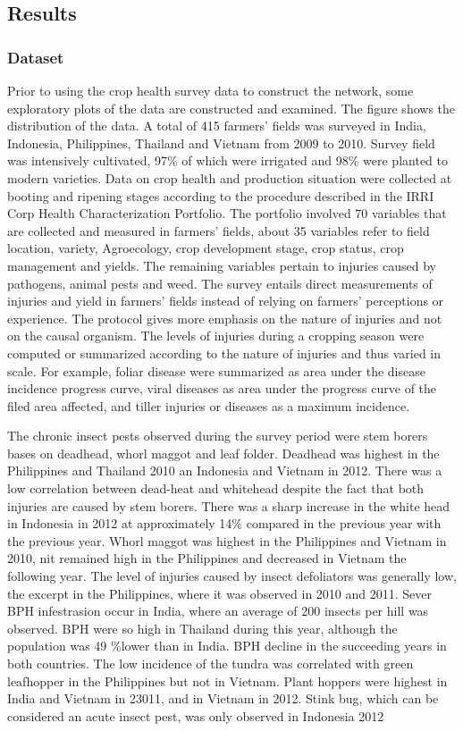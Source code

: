 \subsection{Results}

\subsubsection{Dataset}

Prior to using the crop health survey data to construct the network, some exploratory plots of the data are constructed and examined. The figure shows the distribution of the data. A total of 415 farmers' fields was surveyed in India, Indonesia, Philippines, Thailand and Vietnam from 2009 to 2010. Survey field was intensively cultivated, 97\% of which were irrigated and 98\% were planted to modern varieties. Data on crop health and production situation were collected at booting and ripening stages according to the procedure described in the IRRI Corp Health Characterization Portfolio\cite{Savary_2009_Survey}.  The portfolio involved 70 variables that are collected and measured in farmers' fields, about 35 variables refer to field location, variety, Agroecology, crop development stage, crop status, crop management and yields. The remaining variables pertain to injuries caused by pathogens, animal pests and weed. The survey entails direct measurements of injuries and yield in farmers' fields instead of relying on farmers' perceptions or experience. The protocol gives more emphasis on the nature of injuries and not on the causal organism. The levels of injuries during a cropping season were computed or summarized according to the nature of injuries and thus varied in scale. For example, foliar disease were summarized as area under the disease incidence progress curve, viral diseases as area under the progress curve of the filed area affected, and tiller injuries or diseases as a maximum incidence. 

The chronic insect pests observed during the survey period were stem borers bases on deadhead, whorl maggot and leaf folder. Deadhead was highest in the Philippines and Thailand 2010 an Indonesia and Vietnam in 2012. There was a low correlation between dead-heat and whitehead despite the fact that both injuries are caused by stem borers. There was a sharp increase in the white head  in  Indonesia  in 2012 at approximately 14\% compared in the previous year with the previous year. Whorl maggot was highest in the Philippines and Vietnam in 2010, nit remained high in the Philippines and decreased in Vietnam the following year. The level of injuries caused by insect defoliators was generally low, the excerpt in the Philippines, where it was observed in 2010 and 2011. Sever BPH infestrasion occur in India, where an average of 200 insects per hill was observed. BPH were so high in Thailand during this year, although the population was 49 \%lower than in India. BPH decline in the succeeding years in both countries. The low incidence of the tundra was correlated with green leafhopper in the Philippines  but not in Vietnam. Plant hoppers were highest in India and Vietnam in 23011, and in Vietnam in 2012. Stink bug, which can be considered an acute insect pest, was only observed in Indonesia 2012

